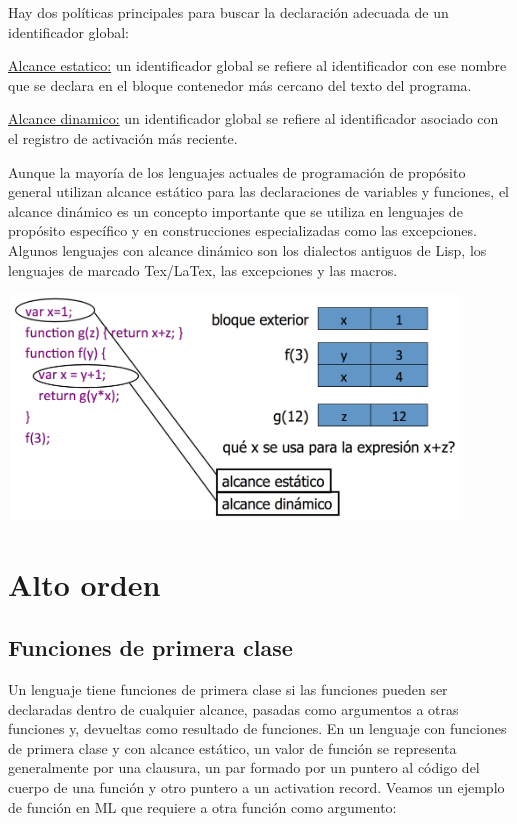 \documentclass[10pt,a4paper]{report}
\begin{document}
Hay dos políticas principales para buscar la declaración adecuada de
un identificador global:

\begin{description}
\item \underline{Alcance estatico:} un identificador global se refiere al identificador con ese nombre que se declara en el bloque contenedor más cercano del texto del programa.
\item \underline{Alcance dinamico:} un identificador global se refiere al identificador asociado con el registro de activación más reciente.
\end{description}

\par Aunque la mayoría de los lenguajes actuales de programación de
propósito general utilizan alcance estático para las declaraciones de
variables y funciones, el alcance dinámico es un concepto importante
que se utiliza en lenguajes de propósito específico y en
construcciones especializadas como las excepciones. Algunos lenguajes
con alcance dinámico son los dialectos antiguos de Lisp, los lenguajes
de marcado Tex/LaTex, las excepciones y las macros.

\begin{center} 	
		\includegraphics[width=12cm, height=6cm]{estaticodinamico.png}
\end{center}

\section{Alto orden}

\subsection{Funciones de primera clase}
Un lenguaje tiene funciones de primera clase si las funciones pueden ser declaradas 
dentro de cualquier alcance,
pasadas como argumentos a otras funciones y,
devueltas como resultado de funciones.
En un lenguaje con funciones de primera clase y con alcance estático, un valor de 
función se representa generalmente por una clausura, un par formado por un 
puntero al código del cuerpo de una función y otro puntero a un activation record.
Veamos un ejemplo de función en ML que requiere a otra función como argumento:
\end{document}
